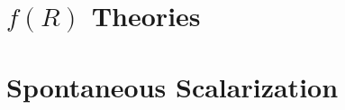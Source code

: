 \documentclass[a4paper,12pt,oneside,customfont,custombib,PageStyleII]{Settings/PhDThesisPSnPDF}
\begin{document}
\chapter{\texorpdfstring{$f(R)$}{f(R)} Theories}\label{chap:chapter2}




\chapter{Spontaneous Scalarization}\label{chap:SS}





\begin{appendices} %
\chapter{}\label{appendixA}

\end{appendices}

\backmatter

\begin{spacing}{0.9}

\cleardoublepage
\nocite{*}
\printbibliography[heading=bibintoc, title={References}]
\thispagestyle{empty}
\end{spacing}

\end{document}
